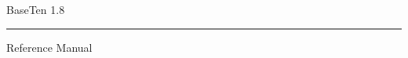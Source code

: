\documentclass[a4paper]{book}
\begin{document}
\begin{titlepage}
\fontsize{40pt}{0pt}\selectfont
\vspace*{5cm}
\parbox{\columnwidth}{\raggedright{BaseTen 1.8}}
\rule{\columnwidth}{1pt}
\fontsize{18pt}{16pt}\selectfont
\parbox{\columnwidth}{\raggedright\hspace{1mm}Reference Manual}
\vfill
{}
\end{titlepage}

\clearemptydoublepage
{}
\tableofcontents
\clearemptydoublepage
{}
\end{document}
